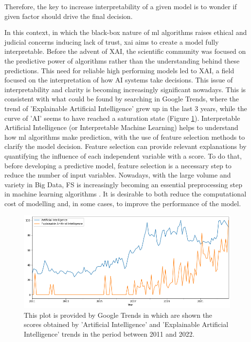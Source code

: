 Therefore, the key to increase interpretability of a given model is to wonder if given factor should drive the final decision.\par
In this context, in which the black-box nature of \acrshort{ml} algorithms raises ethical and judicial concerns inducing lack of trust\cite{9141213}, \gls{xai} aims to create a model fully interpretable.
Before the advent of XAI, the scientific community was focused on the predictive power of algorithms rather than the understanding behind these predictions.
This need for reliable high performing models led to XAI, a field focused on the interpretation of how AI systems take decisions.
This issue of interpretability and clarity is becoming increasingly significant nowadays. 
This is consistent with what could be found by searching in Google Trends, where the trend of 'Explainable Artificial Intelligence' grew up in the last 3 years, while the curve of 'AI' seems to have reached a saturation state (Figure \ref{fig:AI_XAI}).
Interpretable Artificial Intelligence (or Interpretable Machine Learning) helps to understand how \acrshort{ml} algorithms make prediction, with the use of feature selection methods to clarify the model decision.
Feature selection can provide relevant explanations by quantifying the influence of each independent variable with a score.
To do that, before developing a predictive model, feature selection is a necessary step to reduce the number of input variables. \newline
Nowadays, with the large volume and variety in Big Data, FS is increasingly becoming an essential preprocessing step in machine learning algorithms \cite{kamolov2021feature}.
It is desirable to both reduce the computational cost of modelling and, in some cases, to improve the performance of the model.\newline
\begin{figure}[H]
    \includegraphics[scale=0.50]{images/AI_XAI.png}
    \caption{This plot is provided by Google Trends in which are shown the scores obtained by 'Artificial Intelligence' and 'Explainable Artificial Intelligence' trends in the period between 2011 and 2022.}
    \label{fig:AI_XAI}
\end{figure}
